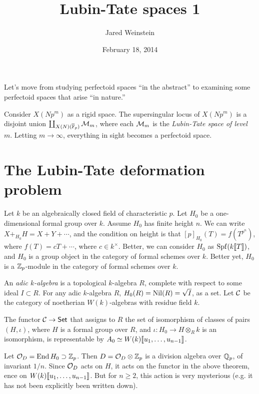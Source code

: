 \documentclass{article}
\title{Lubin-Tate spaces 1}
\author{Jared Weinstein}
\date{February 18, 2014}
\begin{document}
\maketitle

Let's move from studying perfectoid spaces ``in the abstract'' to examining some 
perfectoid spaces that arise ``in nature.'' 

Consider $X(N p^m)$ as a rigid space. The supersingular locus of $X(N p^m)$ is 
a disjoint union $\coprod_{X(N)(\overline{\mathbb{F}}_p)} \mathcal{M}_m$, where each $\mathcal{M}_m$ is 
the \emph{Lubin-Tate space of level $m$}. Letting $m\to \infty$, everything 
in sight becomes a perfectoid space. 





\section{The Lubin-Tate deformation problem}

Let $k$ be an algebraically closed field of characteristic $p$. Let $H_0$ be a 
one-dimensional formal group over $k$. Assume $H_0$ has finite height $n$. 
We can write $X+_{H_0} H = X+Y+\cdots$, and the condition on height is that 
$[p]_{H_0}(T) = f(T^{p^n})$, where $f(T) = c T+\cdots$, where 
$c\in k^\times$. Better, we can consider $H_0$ as $\operatorname{Spf}(k\llbracket {T} \rrbracket)$, and $H_0$ 
is a group object in the category of formal schemes over $k$. Better yet, 
$H_0$ is a $\mathbb{Z}_p$-module in the category of formal schemes over $k$. 

An \emph{adic $k$-algebra} is a topological $k$-algebra $R$, complete with 
respect to some ideal $I\subset R$. For any adic $k$-algebra $R$, 
$H_0(R)=\operatorname{Nil}(R)=\sqrt I$, as a set. Let $\mathcal{C}$ be the category of noetherian 
$W(k)$-algebras with residue field $k$. 


\begin{theorem}
The functor $\mathcal{C}\to \mathsf{Set}$ that assigns to $R$ the set of isomorphism 
of classes of pairs $(H,\iota)$, where $H$ is a formal group over $R$, and 
$\iota:H_0 \to H\otimes_R k$ is an isomorphism, is representable by 
$A_0\simeq W(k)\llbracket {u_1,\dots,u_{n-1}} \rrbracket$. 
\end{theorem}

Let $\mathcal{O}_D=\operatorname{End} H_0 \supset \mathbb{Z}_p$. Then $D=\mathcal{O}_D\otimes\mathbb{Z}_p$ is a division 
algebra over $\mathbb{Q}_p$, of invariant $1/n$. Since $\mathcal{O}_D$ acts on $H$, it acts 
on the functor in the above theorem, ence on $W(k)\llbracket {u_1,\dots,u_{n-1}} \rrbracket$. But 
for $n\geqslant 2$, this action is very mysterious (e.g. it has not been 
explicitly been written down). 
\end{document}
